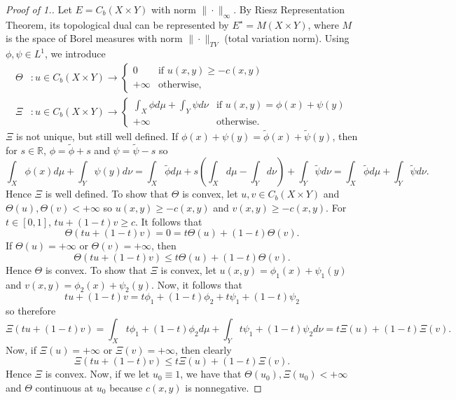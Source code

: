 \documentclass[12pt]{article}
\newcommand{\R}{\mathbb{R}}
\theoremstyle{plain}
\numberwithin{equation}{section}
\begin{document}
\begin{proof}[Proof of 1.]
  Let $E = C_b(X\times Y)$ with norm $\|\cdot\|_\infty$. By Riesz Representation Theorem, its topological dual can be represented by 
  $E^\star = M(X\times Y)$, where $M$ is the space of Borel measures with norm $\|\cdot\|_{TV}$ (total variation norm). Using $\phi,\psi\in L^1$, we introduce 
  \begin{align}
    \Theta &: u\in C_b(X\times Y)\to \begin{cases}
      0 &\text{if } u(x,y)\ge -c(x,y) \\
      +\infty &\text{otherwise,}
    \end{cases} \\
    \Xi &: u\in C_b(X\times Y)\to \begin{cases}
      \int_X \phi d\mu + \int_Y \psi d\nu &\text{if }u(x,y) = \phi(x) + \psi(y)\\
      +\infty&\text{otherwise.}
    \end{cases}
  \end{align}
$\Xi$ is not unique, but still well defined. If $\phi(x) + \psi(y) = \tilde{\phi}(x) + \tilde{\psi}(y)$, then for $s\in\R$, $\phi = \tilde{\phi} + s$ and $\psi = \tilde{\psi} -s$ so \[ \int_X \phi(x)d\mu + \int_Y \psi(y)d\nu = \int_X \tilde{\phi} d\mu + s\left(\int_Xd\mu - \int_Yd\nu\right) + \int_Y\tilde{\psi}d\nu = \int_X \tilde{\phi} d\mu + \int_Y\tilde{\psi}d\nu.\]
Hence $\Xi$ is well defined.\newline
To show that $\Theta$ is convex, let $u,v\in C_b(X\times Y)$ and $\Theta(u),\Theta(v) < +\infty$ so $u(x,y) \ge -c(x,y)$ and $v(x,y) \ge -c(x,y)$. For $t\in [0,1]$, 
\(tu + (1-t)v \ge c.\) It follows that 
\[\Theta(tu + (1-t)v) = 0 = t\Theta(u) + (1-t)\Theta(v).\]
If $\Theta(u) = +\infty$ or $\Theta(v) = +\infty$, then 
\[\Theta(tu + (1-t)v) \le t\Theta(u) + (1-t)\Theta(v).\]
Hence $\Theta$ is convex.\newline
To show that $\Xi$ is convex, let $u(x,y) = \phi_1(x) + \psi_1(y)$ and $v(x,y) = \phi_2(x) + \psi_2(y)$. Now, it follows that 
\[tu + (1-t)v = t\phi_1 + (1-t)\phi_2 + t\psi_1 + (1-t)\psi_2\]
so therefore
\[\Xi(tu + (1-t)v) = \int_{X}t\phi_1 + (1-t)\phi_2d\mu + \int_{Y}t\psi_1 + (1-t)\psi_2d\nu = t\Xi(u) + (1-t)\Xi(v).\]
Now, if $\Xi(u) = +\infty$ or $\Xi(v) = +\infty$, then clearly 
\[\Xi(tu + (1-t)v) \le t\Xi(u) + (1-t)\Xi(v).\]
Hence $\Xi$ is convex.\newline
Now, if we let $u_0\equiv 1$, we have that $\Theta(u_0),\Xi(u_0) < +\infty$ and $\Theta$ continuous at $u_0$ because $c(x,y)$ is nonnegative. 

\end{proof}
\end{document}
